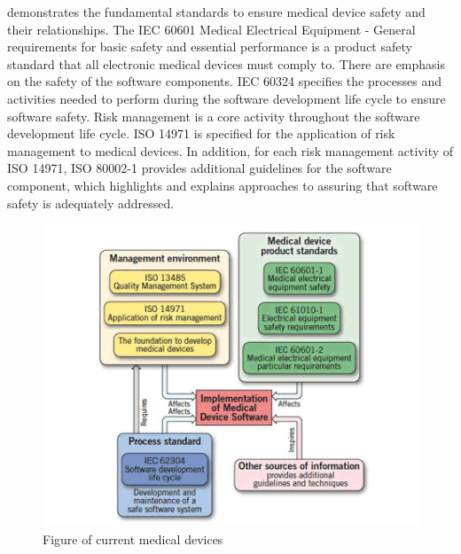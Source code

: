  demonstrates the fundamental standards to ensure medical device safety and their relationships. The IEC 60601 Medical Electrical Equipment - General requirements for basic safety and essential performance is a product safety standard that all electronic medical devices must comply to. There are emphasis on the safety of the software components. IEC 60324 specifies the processes and activities needed to perform during the software development life cycle to ensure software safety. 
Risk management is a core activity throughout the software development life cycle. ISO 14971 is specified for the application of risk management to medical devices. In addition, for each risk management activity of ISO 14971, ISO 80002-1 provides additional guidelines for the software component, which highlights and explains approaches to assuring that software safety is adequately addressed.
\begin{figure}[t]
		\centering
		\includegraphics[width=\textwidth]{figs/standards.jpg}
		\caption{\small Figure of current medical devices}
		\label{fig:standards}
\end{figure}
